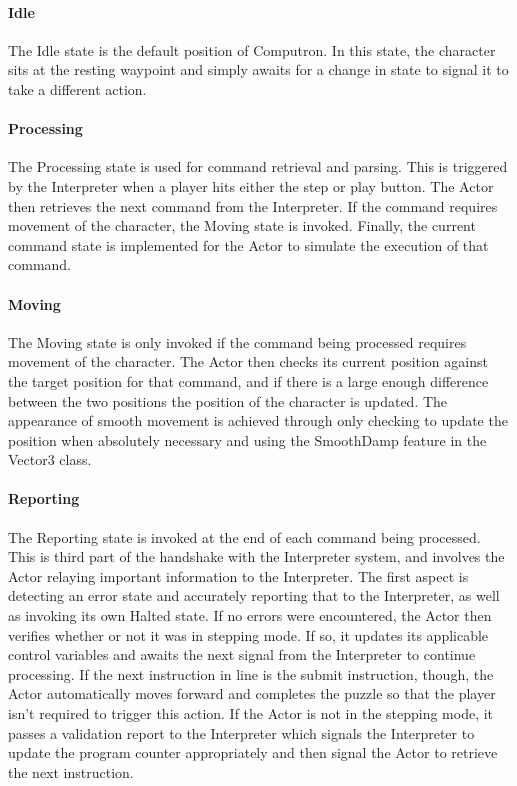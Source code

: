 \paragraph{Idle}
The Idle state is the default position of Computron. In this state, the character sits at the resting waypoint and simply awaits for a change in state to signal it to take a different action.

\paragraph{Processing}
The Processing state is used for command retrieval and parsing. This is triggered by the Interpreter when a player hits either the step or play button. The Actor then retrieves the next command from the Interpreter. If the command requires movement of the character, the Moving state is invoked. Finally, the current command state is implemented for the Actor to simulate the execution of that command.

\paragraph{Moving}
The Moving state is only invoked if the command being processed requires movement of the character. The Actor then checks its current position against the target position for that command, and if there is a large enough difference between the two positions the position of the character is updated. The appearance of smooth movement is achieved through only checking to update the position when absolutely necessary and using the SmoothDamp feature in the Vector3 class.

\paragraph{Reporting}
The Reporting state is invoked at the end of each command being processed. This is third part of the handshake with the Interpreter system, and involves the Actor relaying important information to the Interpreter. The first aspect is detecting an error state and accurately reporting that to the Interpreter, as well as invoking its own Halted state. If no errors were encountered, the Actor then verifies whether or not it was in stepping mode. If so, it updates its applicable control variables and awaits the next signal from the Interpreter to continue processing. If the next instruction in line is the submit instruction, though, the Actor automatically moves forward and completes the puzzle so that the player isn't required to trigger this action. If the Actor is not in the stepping mode, it passes a validation report to the Interpreter which signals the Interpreter to update the program counter appropriately and then signal the Actor to retrieve the next instruction.

